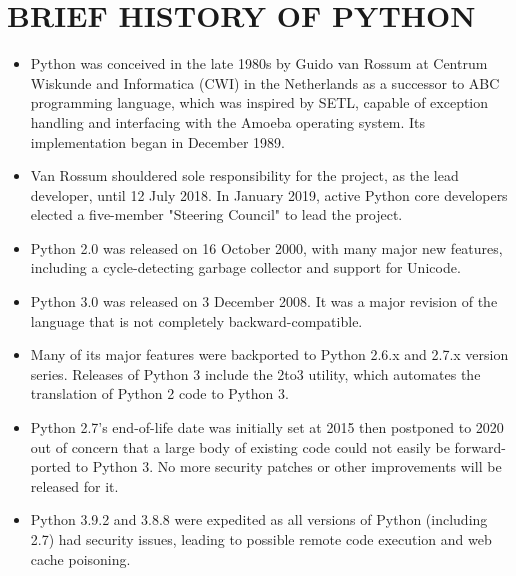 \documentclass{article}
\begin{document}
\section*{BRIEF HISTORY OF PYTHON}
\begin{itemize}
	\item Python was conceived in the late 1980s by Guido van Rossum at Centrum Wiskunde and Informatica (CWI) in the Netherlands as a successor to ABC programming language, which was inspired by SETL, capable of exception handling and interfacing with the Amoeba operating system. 
	Its implementation began in December 1989.
	\item Van Rossum shouldered sole responsibility for the project, as the lead developer, until 12 July 2018.
	In January 2019, active Python core developers elected a five-member "Steering Council" to lead the project.
	\item Python 2.0 was released on 16 October 2000, with many major new features, including a cycle-detecting garbage collector and support for Unicode.
	\item Python 3.0 was released on 3 December 2008. It was a major revision of the language that is not completely backward-compatible.
	\item Many of its major features were backported to Python 2.6.x and 2.7.x version series. Releases of Python 3 include the 2to3 utility, which automates the translation of Python 2 code to Python 3.
	\item Python 2.7's end-of-life date was initially set at 2015 then postponed to 2020 out of concern that a large body of existing code could not easily be forward-ported to Python 3. No more security patches or other improvements will be released for it.
	\item Python 3.9.2 and 3.8.8 were expedited as all versions of Python (including 2.7) had security issues, leading to possible remote code execution and web cache poisoning.
\end{itemize}
\newpage
\end{document}
